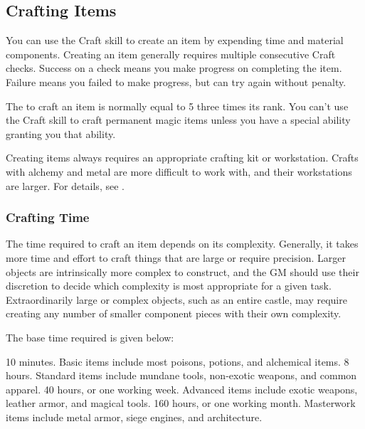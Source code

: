   \subsection{Crafting Items}\label{Crafting Items}
    You can use the Craft skill to create an item by expending time and material components.
    Creating an item generally requires multiple consecutive Craft checks.
    Success on a check means you make progress on completing the item.
    Failure means you failed to make progress, but can try again without penalty.

    The  to craft an item is normally equal to 5 \add three times its rank.
    You can't use the Craft skill to craft permanent magic items unless you have a special ability granting you that ability.

    Creating items always requires an appropriate crafting kit or workstation.
    Crafts with alchemy and metal are more difficult to work with, and their workstations are larger.
    For details, see .

    \subsubsection{Crafting Time}
      The time required to craft an item depends on its complexity.
      Generally, it takes more time and effort to craft things that are large or require precision.
      Larger objects are intrinsically more complex to construct, and the GM should use their discretion to decide which complexity is most appropriate for a given task.
      Extraordinarily large or complex objects, such as an entire castle, may require creating any number of smaller component pieces with their own complexity.

      The base time required is given below:
      \begin{raggeditemize}
         10 minutes. Basic items include most poisons, potions, and alchemical items.
         8 hours. Standard items include mundane tools, non-exotic weapons, and common apparel.
         40 hours, or one working week. Advanced items include exotic weapons, leather armor, and magical tools.
         160 hours, or one working month. Masterwork items include metal armor, siege engines, and architecture.
      \end{raggeditemize}

